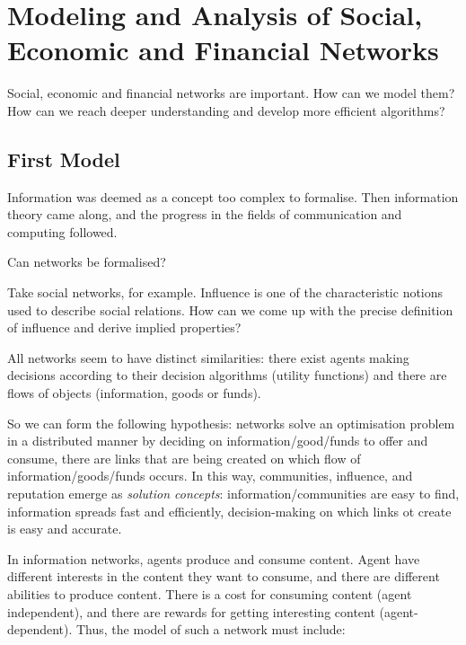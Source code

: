 \documentclass[11pt]{scrartcl}
\begin{document}
\section{Modeling and Analysis of Social, Economic and Financial Networks}

\begin{problem*}
Social, economic and financial networks are important. How can we model them? How can we reach deeper understanding and develop more efficient algorithms?
\end{problem*}

\subsection{First Model}

Information was deemed as a concept too complex to formalise. Then
information theory came along, and the progress in the fields of
communication and computing followed.

Can networks be formalised?

Take social networks, for example. Influence is one of the
characteristic notions used to describe social relations. How can we
come up with the precise definition of influence and derive implied
properties?

All networks seem to have distinct similarities: there exist agents
making decisions according to their decision algorithms (utility
functions) and there are flows of objects (information, goods or
funds).

So we can form the following hypothesis: networks solve an
optimisation problem in a distributed manner by deciding on
information/good/funds to offer and consume, there are links that are
being created on which flow of information/goods/funds occurs. In this
way, communities, influence, and reputation emerge as \textit{solution
  concepts}: information/communities are easy to find, information
spreads fast and efficiently, decision-making on which links ot create
is easy and accurate.

In information networks, agents produce and consume content. Agent
have different interests in the content they want to consume, and
there are different abilities to produce content. There is a cost for
consuming content (agent independent), and there are rewards for
getting interesting content (agent-dependent). Thus, the model of such a network must include:
\end{document}
